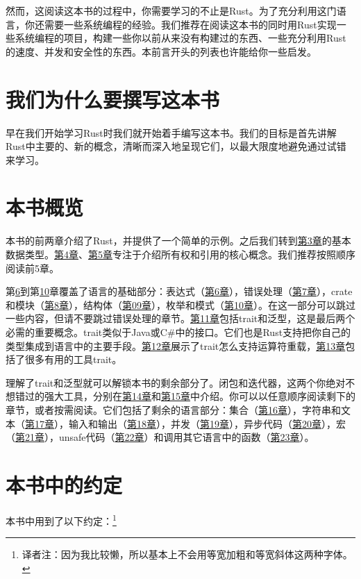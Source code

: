 然而，这阅读这本书的过程中，你需要学习的不止是Rust。为了充分利用这门语言，你还需要一些系统编程的经验。我们推荐在阅读这本书的同时用Rust实现一些系统编程的项目，构建一些你以前从来没有构建过的东西、一些充分利用Rust的速度、并发和安全性的东西。本前言开头的列表也许能给你一些启发。

\section*{我们为什么要撰写这本书}
早在我们开始学习Rust时我们就开始着手编写这本书。我们的目标是首先讲解Rust中主要的、新的概念，清晰而深入地呈现它们，以最大限度地避免通过试错来学习。

\section*{本书概览}
本书的前两章介绍了Rust，并提供了一个简单的示例。之后我们转到\hyperref[ch03]{第3章}的基本数据类型。\hyperref[ch04]{第4章}、\hyperref[ch05]{第5章}专注于介绍所有权和引用的核心概念。我们推荐按照顺序阅读前5章。

第\hyperref[ch06]{6}到第\hyperref[ch10]{10}章覆盖了语言的基础部分：表达式（\hyperref[ch06]{第6章}），错误处理（\hyperref[ch07]{第7章}），crate和模块（\hyperref[ch08]{第8章}），结构体（\hyperref[ch9]{第09章}），枚举和模式（\hyperref[ch10]{第10章}）。在这一部分可以跳过一些内容，但请不要跳过错误处理的章节。\hyperref[ch11]{第11章}包括trait和泛型，这是最后两个必需的重要概念。trait类似于Java或C\#中的接口。它们也是Rust支持把你自己的类型集成到语言中的主要手段。\hyperref[ch12]{第12章}展示了trait怎么支持运算符重载，\hyperref[ch13]{第13章}包括了很多有用的工具trait。

理解了trait和泛型就可以解锁本书的剩余部分了。闭包和迭代器，这两个你绝对不想错过的强大工具，分别在\hyperref[ch14]{第14章}和\hyperref[ch15]{第15章}中介绍。你可以以任意顺序阅读剩下的章节，或者按需阅读。它们包括了剩余的语言部分：集合（\hyperref[ch16]{第16章}），字符串和文本（\hyperref[ch17]{第17章}），输入和输出（\hyperref[ch18]{第18章}），并发（\hyperref[ch19]{第19章}），异步代码（\hyperref[ch20]{第20章}），宏（\hyperref[ch21]{第21章}），unsafe代码（\hyperref[ch22]{第22章}）和调用其它语言中的函数（\hyperref[ch23]{第23章}）。

\section*{本书中的约定}
本书中用到了以下约定：\footnote{译者注：因为我比较懒，所以基本上不会用等宽加粗和等宽斜体这两种字体。}

